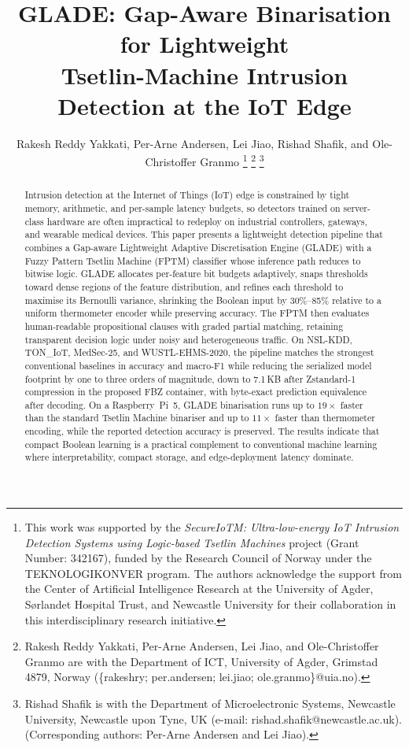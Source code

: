 \documentclass[journal,twoside,web]{ieeecolor}
\begin{document}
\title{GLADE: Gap-Aware Binarisation for Lightweight\\ Tsetlin-Machine Intrusion Detection at the IoT Edge}
\author{Rakesh Reddy Yakkati, Per-Arne Andersen, Lei Jiao, Rishad Shafik, and Ole-Christoffer Granmo
\thanks{This work was supported by the \textit{SecureIoTM: Ultra-low-energy IoT Intrusion Detection Systems using Logic-based Tsetlin Machines} project (Grant Number: 342167), funded by the Research Council of Norway under the TEKNOLOGIKONVER program. 
The authors acknowledge the support from the Center of Artificial Intelligence Research at the University of Agder, Sørlandet Hospital Trust, and Newcastle University for their collaboration in this interdisciplinary research initiative.}%
\thanks{Rakesh Reddy Yakkati, Per-Arne Andersen, Lei Jiao, and Ole-Christoffer Granmo are with the Department of ICT, 
University of Agder, Grimstad 4879, Norway (\{rakeshry; per.andersen; lei.jiao; ole.granmo\}@uia.no). }
\thanks{Rishad Shafik is with the Department of Microelectronic Systems, Newcastle University, Newcastle upon Tyne, UK (e-mail: rishad.shafik@newcastle.ac.uk). (Corresponding authors: Per-Arne Andersen and Lei Jiao).}}

\maketitle

\begin{abstract}
Intrusion detection at the Internet of Things (IoT) edge is constrained by tight memory, arithmetic, and per-sample latency budgets, so detectors trained on server-class hardware are often impractical to redeploy on industrial controllers, gateways, and wearable medical devices. This paper presents a lightweight detection pipeline that combines a Gap-aware Lightweight Adaptive Discretisation Engine (GLADE) with a Fuzzy Pattern Tsetlin Machine (FPTM) classifier whose inference path reduces to bitwise logic. GLADE allocates per-feature bit budgets adaptively, snaps thresholds toward dense regions of the feature distribution, and refines each threshold to maximise its Bernoulli variance, shrinking the Boolean input by 30\%--85\% relative to a uniform thermometer encoder while preserving accuracy. The FPTM then evaluates human-readable propositional clauses with graded partial matching, retaining transparent decision logic under noisy and heterogeneous traffic. On NSL-KDD, TON\_IoT, MedSec-25, and WUSTL-EHMS-2020, the pipeline matches the strongest conventional baselines in accuracy and macro-F1 while reducing the serialized model footprint by one to three orders of magnitude, down to 7.1\,KB after Zstandard-1 compression in the proposed FBZ container, with byte-exact prediction equivalence after decoding. On a Raspberry~Pi~5, GLADE binarisation runs up to $19\times$ faster than the standard Tsetlin Machine binariser and up to $11\times$ faster than thermometer encoding, while the reported detection accuracy is preserved. The results indicate that compact Boolean learning is a practical complement to conventional machine learning where interpretability, compact storage, and edge-deployment latency dominate.
\end{abstract}
\end{document}
